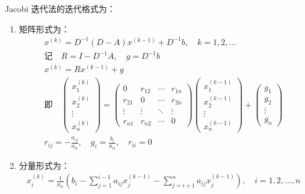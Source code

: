 Jacobi 迭代法的迭代格式为：
\begin{enumerate}
    \item 矩阵形式为：
\begin{gather*}
x^{(k)} = D^{-1}(D - A)x^{(k-1)} + D^{-1}b, \quad k = 1, 2, \dots\\
\text{记}\quad R=I-D^{-1}A,\quad g=D^{-1}b\\
x^{(k)} = Rx^{(k-1)} + g\\
\text{即}\quad \begin{pmatrix}
x_{1}^{(k)} \\
x_{2}^{(k)} \\
\vdots \\
x_{n}^{(k)}
\end{pmatrix}
=
\begin{pmatrix}
0 & r_{12} & \cdots & r_{1n} \\
r_{21} & 0 & \cdots & r_{2n} \\
\vdots & \vdots & \ddots & \vdots \\
r_{n1} & r_{n2} & \cdots & 0
\end{pmatrix}
\begin{pmatrix}
x_{1}^{(k-1)} \\
x_{2}^{(k-1)} \\
\vdots \\
x_{n}^{(k-1)}
\end{pmatrix}
+
\begin{pmatrix}
g_{1} \\
g_{2} \\
\vdots \\
g_{n}
\end{pmatrix}\\
r_{ij} = -\frac{a_{ij}}{a_{ii}}, \quad g_i = \frac{b_i}{a_{ii}}, \quad r_{ii} = 0
\end{gather*}

\item 分量形式为：
\begin{gather*}
x_i^{(k)} = \frac{1}{a_{ii}} \left( b_i - \sum_{j=1}^{i-1} a_{ij}x_j^{(k-1)} - \sum_{j=i+1}^{n} a_{ij}x_j^{(k-1)} \right), \quad i = 1, 2, \dots, n
\end{gather*}
\end{enumerate}

